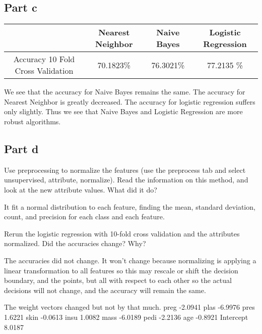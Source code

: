 \documentclass{article}
\begin{document}
\subsection{Part c}
\begin{table}[h]
    \begin{center}
    \begin{tabular}{|c|c|c|c|}
   \hline
        & Nearest Neighbor & Naive Bayes & Logistic Regression \\ \hline
         Accuracy 10 Fold Cross Validation &  70.1823\%&76.3021\% &  77.2135 \%   \\ \hline
       
             
     
    \end{tabular}
    \end{center}
\end{table}

We see that the accuracy for Naive Bayes remains the same. The accuracy for Nearest Neighbor is greatly decreased. The accuracy for logistic regression suffers only slightly. Thus we see that Naive Bayes and Logistic Regression are more robust algorithms. 

\subsection{Part d}
Use preprocessing to normalize the features (use the preprocess tab and select unsupervised, attribute, normalize). Read the information on this method, and look at the new attribute values. What did it do?

It fit a normal distribution to each feature, finding the mean, standard deviation, count, and precision for each class and each feature. 

Rerun the logistic regression with 10-fold cross validation and the attributes normalized. Did the accuracies change? Why?

The accuracies did not change. It won't change because normalizing is applying a linear transformation to all features so this may rescale or shift the decision boundary, and the points, but all with respect to each other so the actual decisions will not change, and the accuracy will remain the same. 

The weight vectors changed but not by that much. 
preg                 -2.0941
plas                 -6.9976
pres                  1.6221
skin                 -0.0613
insu                  1.0082
mass                 -6.0189
pedi                 -2.2136
age                  -0.8921
Intercept             8.0187
\end{document}
